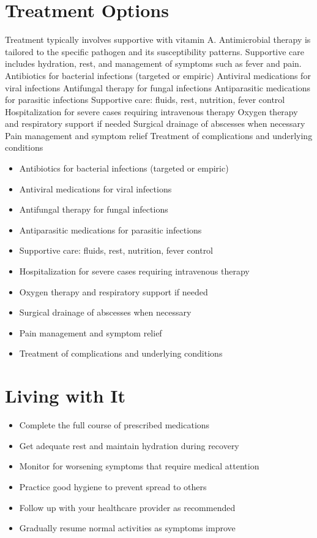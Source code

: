 \section{Treatment Options}
Treatment typically involves supportive with vitamin A. Antimicrobial therapy is tailored to the specific pathogen and its susceptibility patterns. Supportive care includes hydration, rest, and management of symptoms such as fever and pain. Antibiotics for bacterial infections (targeted or empiric) Antiviral medications for viral infections Antifungal therapy for fungal infections Antiparasitic medications for parasitic infections Supportive care: fluids, rest, nutrition, fever control Hospitalization for severe cases requiring intravenous therapy Oxygen therapy and respiratory support if needed Surgical drainage of abscesses when necessary Pain management and symptom relief Treatment of complications and underlying conditions

\begin{itemize}[noitemsep]
  \item Antibiotics for bacterial infections (targeted or empiric)
  \item Antiviral medications for viral infections
  \item Antifungal therapy for fungal infections
  \item Antiparasitic medications for parasitic infections
  \item Supportive care: fluids, rest, nutrition, fever control
  \item Hospitalization for severe cases requiring intravenous therapy
  \item Oxygen therapy and respiratory support if needed
  \item Surgical drainage of abscesses when necessary
  \item Pain management and symptom relief
  \item Treatment of complications and underlying conditions
\end{itemize}
\section{Living with It}
\begin{itemize}[noitemsep]
  \item Complete the full course of prescribed medications
  \item Get adequate rest and maintain hydration during recovery
  \item Monitor for worsening symptoms that require medical attention
  \item Practice good hygiene to prevent spread to others
  \item Follow up with your healthcare provider as recommended
  \item Gradually resume normal activities as symptoms improve
\end{itemize}
